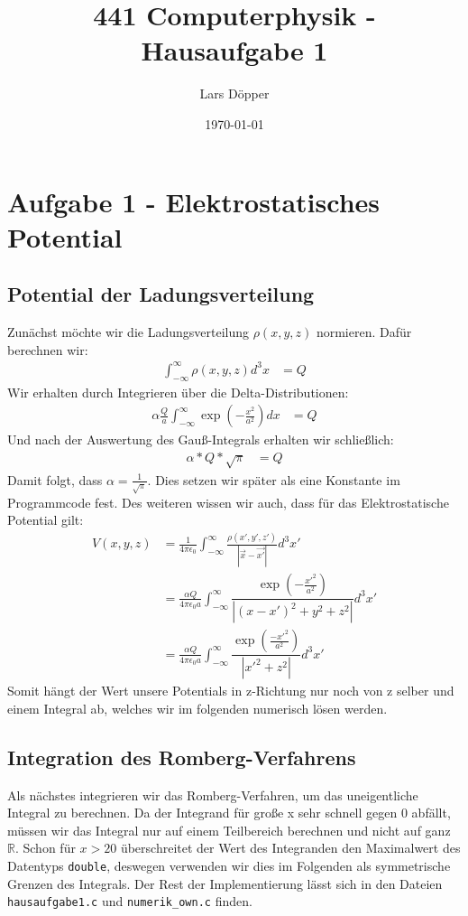 \documentclass[12pt,a4paper]{article}
\author{Lars Döpper}
\date{\today}
\title{441 Computerphysik - Hausaufgabe 1}
\begin{document}
	\maketitle
\section{Aufgabe 1 - Elektrostatisches Potential}
\subsection{Potential der Ladungsverteilung}
Zunächst möchte wir die Ladungsverteilung $\rho(x,y,z)$ normieren. Dafür berechnen wir:
\begin{align}
	\int_{-\infty}^{\infty}\rho(x,y,z)d^3x &= Q
\end{align}
Wir erhalten durch Integrieren über die Delta-Distributionen:
\begin{align}
	\alpha\frac{Q}{a}\int_{-\infty}^{\infty}\exp\left(-\frac{x^2}{a^2}\right)dx &= Q
\end{align}
Und nach der Auswertung des Gauß-Integrals erhalten wir schließlich:
\begin{align}
	\alpha*Q*\sqrt{\pi} &= Q
\end{align}
Damit folgt, dass $\alpha = \frac{1}{\sqrt{\pi}}$. Dies setzen wir später als eine Konstante im Programmcode fest. Des weiteren wissen wir auch, dass für das Elektrostatische Potential gilt:
\begin{align}
	V(x,y,z) &= \frac{1}{4\pi\epsilon_0}\int_{-\infty}^{\infty}\frac{\rho(x',y',z')}{|\vec{x}-\vec{x'}|}d^3x' \\
	&= \frac{\alpha Q}{4\pi\epsilon_0a}\int_{-\infty}^{\infty}\dfrac{\exp(-\frac{x'^2}{a^2})}{|(x-x')^2 + y^2 +z^2|}d^3x' \\
	&= \frac{\alpha Q}{4\pi\epsilon_0a}\int_{-\infty}^{\infty}\dfrac{\exp(\frac{-x'^2}{a^2})}{|x'^2 + z^2|}d^3x'
\end{align}
Somit hängt der Wert unsere Potentials in z-Richtung nur noch von z selber und einem Integral ab, welches wir im folgenden numerisch lösen werden.

\subsection{Integration des Romberg-Verfahrens}
Als nächstes integrieren wir das Romberg-Verfahren, um das uneigentliche Integral zu berechnen. Da der Integrand für große x sehr schnell gegen 0 abfällt, müssen wir das Integral nur auf einem Teilbereich berechnen und nicht auf ganz $ \mathds{R} $. Schon für $x > 20$ überschreitet der Wert des Integranden den Maximalwert des Datentyps \verb|double|, deswegen verwenden wir dies im Folgenden als symmetrische Grenzen des Integrals. Der Rest der Implementierung lässt sich in den Dateien \verb|hausaufgabe1.c| und \verb|numerik_own.c| finden.
\end{document}
